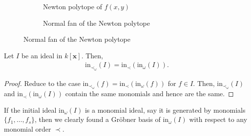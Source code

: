 \documentclass[a4paper, 11pt]{article}
\begin{document}
\begin{figure}[H]
  \centering
  \begin{subfigure}[b]{0.45\linewidth}
    \caption{Newton polytope of \( f(x,y) \)} \label{fig:newton-polytope}  
  \end{subfigure}
  \begin{subfigure}[b]{0.45\linewidth}
    \caption{Normal fan of the Newton polytope} \label{fig:normal-fan-newton-polytope}  
  \end{subfigure}
\end{figure}

\begin{prop}
  Let \( I \) be an ideal in \( k[\mathbf x] \). Then,
  \begin{align*}
    \mathrm{in}_{\prec_\omega} (I) = \mathrm{in}_\prec(\mathrm{in}_\omega(I)).
  \end{align*}
\end{prop}

\begin{proof}
  Reduce to the case \(  \mathrm{in}_{\prec_\omega} (f) = \mathrm{in}_\prec(\mathrm{in}_\omega(f)) \) for \( f \in I \). Then, \( \mathrm{in}_{\prec_\omega} (I)  \) and \( \mathrm{in}_\prec(\mathrm{in}_\omega(I)) \) contain the same monomials and hence are the same.
\end{proof}

If the initial ideal \( \mathrm{in}_\omega(I) \) is a monomial ideal, say it is generated by monomials \( \{f_1,\dots,f_s\} \), then we clearly found a Gröbner basis of \( \mathrm{in}_\omega(I) \) with respect to any monomial order \( \prec \). 
\end{document}
